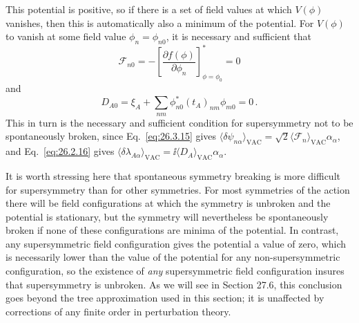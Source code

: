 This potential is positive, so if there is a set of field values at which
\(V(\phi)\) vanishes, then this is automatically also a minimum of the
potential. For \(V(\phi)\) to vanish at some field value
\(\phi_n=\phi_{n0}\), it is necessary and sufficient that
\begin{equation}
  \mathcal{F}_{n0}
  =-\left[
    \frac{\partial f(\phi)}{\partial\phi_n}
  \right]^*_{\phi=\phi_0}
  =0
  \tag{27.4.10}\label{eq:27.4.10}
\end{equation}
and
\begin{equation}
  D_{A0}
  =\xi_A+\sum_{nm}\phi_{n0}^*(t_A)_{nm}\phi_{m0}
  =0\,.
  \tag{27.4.11}\label{eq:27.4.11}
\end{equation}
This in turn is the necessary and sufficient condition for supersymmetry not
to be spontaneously broken, since Eq.~\eqref{eq:26.3.15} gives
\(\langle\delta\psi_{n\alpha}\rangle_{\mathrm{VAC}}
=\sqrt{2}\langle\mathcal{F}_n\rangle_{\mathrm{VAC}}\alpha_\alpha\), and
Eq.~\eqref{eq:26.2.16} gives
\(\langle\delta\lambda_{A\alpha}\rangle_{\mathrm{VAC}}
=\ii\langle D_A\rangle_{\mathrm{VAC}}\alpha_\alpha\).

It is worth stressing here that spontaneous symmetry breaking is more
difficult for supersymmetry than for other symmetries. For most symmetries of
the action there will be field configurations at which the symmetry is
unbroken and the potential is stationary, but the symmetry will nevertheless
be spontaneously broken if none of these configurations are minima of the
potential. In contrast, any supersymmetric field configuration gives the
potential a value of zero, which is necessarily lower than the value of the
potential for any non-supersymmetric configuration, so the existence of
\textit{any} supersymmetric field configuration insures that supersymmetry is
unbroken. As we will see in Section 27.6, this conclusion goes beyond the tree
approximation used in this section; it is unaffected by corrections of any
finite order in perturbation theory.

